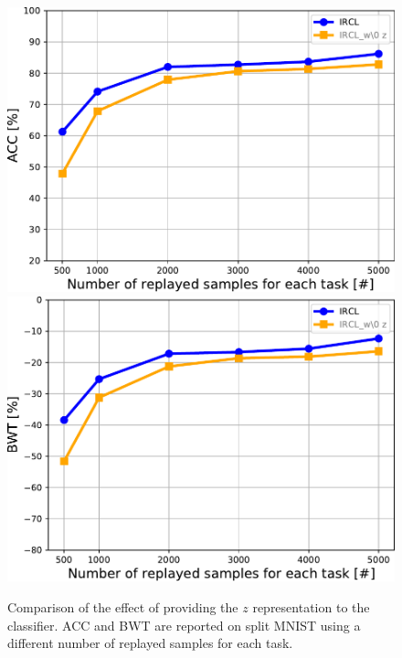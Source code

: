 \documentclass[letterpaper]{article} %
\begin{document}
\begin{figure}[ht]
\centering
\includegraphics[width=0.8\linewidth]{pic/w_wo_z_acc_mnist.pdf}\\
\includegraphics[width=0.8\linewidth]{pic/w_wo_z_bwt_mnist.pdf}
\caption{Comparison of the effect of providing the $z$ representation to the classifier. ACC and BWT are reported on split MNIST using a different number of replayed samples for each task.}
\label{z_with_conditioning_mnist}
\end{figure}
\end{document}
